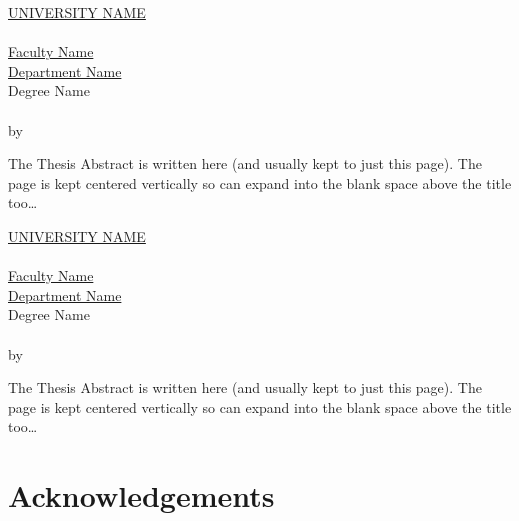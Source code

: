 \clearpage
\thispagestyle{plain}
\null
\vfill
\begin{otherlanguage}{spanish}
  \begin{center}
    \makeatletter
    \MakeUppercase{\href{https://href.com}{University Name}} \\
    \vspace{20pt}
    {\huge \textit{\abstractname}} \\
    \bigskip
    \href{https://href.com}{Faculty Name} \\
    \href{https://href.com}{Department Name} \\
    \bigskip
    Degree Name \\
    \bigskip
    \textbf{\@title} \\
    \medskip
    by \@author \\
    \bigskip
    \makeatother
  \end{center}
  The Thesis Abstract is written here (and usually kept to just this page). The
  page is kept centered vertically so can expand into the blank space above the
  title too\ldots
\end{otherlanguage}
\vfill
\null


\clearpage
\thispagestyle{plain}
\null
\vfill
\begin{otherlanguage}{catalan}
  \begin{center}
    \makeatletter
    \MakeUppercase{\href{https://href.com}{University Name}} \\
    \vspace{20pt}
    {\huge \textit{\abstractname}} \\
    \bigskip
    \href{https://href.com}{Faculty Name} \\
    \href{https://href.com}{Department Name} \\
    \bigskip
    Degree Name \\
    \bigskip
    \textbf{\@title} \\
    \medskip
    by \@author \\
    \bigskip
    \makeatother
  \end{center}
  The Thesis Abstract is written here (and usually kept to just this page). The
  page is kept centered vertically so can expand into the blank space above the
  title too\ldots
\end{otherlanguage}
\vfill
\null


\chapter*{Acknowledgements}

